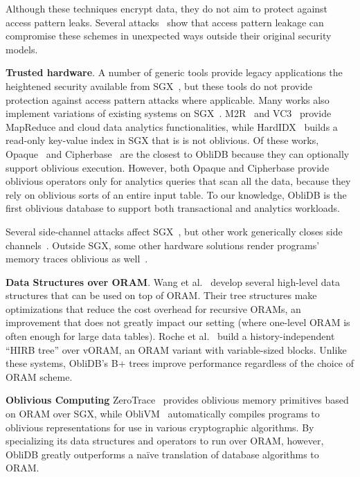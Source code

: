\documentclass[letterpaper,twocolumn,10pt]{article}
\def\name/{ObliDB}
\begin{document}
Although these techniques encrypt data, they do not aim to protect against access pattern leaks.
Several attacks~\cite{IKK12, NKW15, CGPR15, ZKP16} show that access pattern leakage can compromise these schemes in unexpected ways outside their original security models.

\noindent \textbf{Trusted hardware}.
A number of generic tools provide legacy applications the heightened security available from SGX~\cite{BPH15, STTS17, ATG+16, HZX+16}, but these tools do not provide protection against access pattern attacks where applicable.
Many works also implement variations of existing systems on SGX~\cite{FBB+17,FVBG16,NFR+17}.
M2R~\cite{DSC+15} and VC3~\cite{SCF+15} provide MapReduce and cloud data analytics functionalities,
while HardIDX~\cite{FBB+17} builds a read-only key-value index in SGX that is is not oblivious.
Of these works, Opaque~\cite{ZDB+17} and Cipherbase~\cite{cipherbase} are the closest to \name/ because
they can optionally support oblivious execution.
However, both Opaque and Cipherbase provide oblivious operators only for analytics queries that scan all the data, because they rely on oblivious sorts of an entire input table.
To our knowledge, \name/ is the first oblivious database to support both transactional and analytics workloads.

Several side-channel attacks affect SGX~\cite{XCP15, BMD+17, LSG+16, WKPK16}, but other work generically closes side channels~\cite{SLKP17, SCNS16, RLT15, SLK+17}. Outside SGX, some other hardware solutions render programs' memory traces oblivious as well~\cite{CLD16, LHM+15, MLS+13}.

\noindent \textbf{Data Structures over ORAM}. Wang et al.~\cite{WNL+14} develop several high-level data structures that can be used on top of ORAM. Their tree structures make optimizations that reduce the cost overhead for recursive ORAMs, an improvement that does not greatly impact our setting (where one-level ORAM is often enough for large data tables). Roche et al.~\cite{RAC16} build a history-independent ``HIRB tree'' over vORAM, an ORAM variant with variable-sized blocks. Unlike these systems, \name/'s B+ trees improve performance regardless of the choice of ORAM scheme. 

\noindent \textbf{Oblivious Computing}
ZeroTrace~\cite{SGF17} provides oblivious memory primitives based on ORAM over SGX, while ObliVM~\cite{oblivm} automatically compiles programs to oblivious representations for use in various cryptographic algorithms. By specializing its data structures and operators to run over ORAM, however, \name/ greatly outperforms a na\"ive translation of database algorithms to ORAM.
\end{document}
